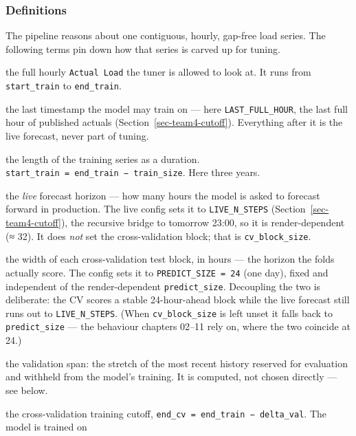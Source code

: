 \documentclass[
  english,
  letterpaper,
]{scrbook}
\providecommand{\tightlist}{%
  \setlength{\itemsep}{0pt}\setlength{\parskip}{0pt}}
\begin{document}
\subsubsection{Definitions}\label{definitions}

The pipeline reasons about one contiguous, hourly, gap-free load series.
The following terms pin down how that series is carved up for tuning.

\begin{description}
\tightlist
\item[Training series]
the full hourly \texttt{Actual\ Load} the tuner is allowed to look at.
It runs from \texttt{start\_train} to \texttt{end\_train}.
\item[\texttt{end\_train}]
the last timestamp the model may train on --- here
\texttt{LAST\_FULL\_HOUR}, the last full hour of published actuals
(Section~\ref{sec-team4-cutoff}). Everything after it is the live
forecast, never part of tuning.
\item[\texttt{train\_size}]
the length of the training series as a duration.
\texttt{start\_train\ =\ end\_train\ −\ train\_size}. Here three years.
\item[\texttt{predict\_size}]
the \emph{live} forecast horizon --- how many hours the model is asked
to forecast forward in production. The live config sets it to
\texttt{LIVE\_N\_STEPS} (Section~\ref{sec-team4-cutoff}), the recursive
bridge to tomorrow 23:00, so it is render-dependent (≈ 32). It does
\emph{not} set the cross-validation block; that is
\texttt{cv\_block\_size}.
\item[\texttt{cv\_block\_size}]
the width of each cross-validation test block, in hours --- the horizon
the folds actually score. The config sets it to
\texttt{PREDICT\_SIZE\ =\ 24} (one day), fixed and independent of the
render-dependent \texttt{predict\_size}. Decoupling the two is
deliberate: the CV scores a stable 24-hour-ahead block while the live
forecast still runs out to \texttt{LIVE\_N\_STEPS}. (When
\texttt{cv\_block\_size} is left unset it falls back to
\texttt{predict\_size} --- the behaviour chapters 02--11 rely on, where
the two coincide at 24.)
\item[\texttt{delta\_val}]
the validation span: the stretch of the most recent history reserved for
evaluation and withheld from the model's training. It is computed, not
chosen directly --- see below.
\item[\texttt{end\_cv}]
the cross-validation training cutoff,
\texttt{end\_cv\ =\ end\_train\ −\ delta\_val}. The model is trained on

\end{description}
\end{document}
